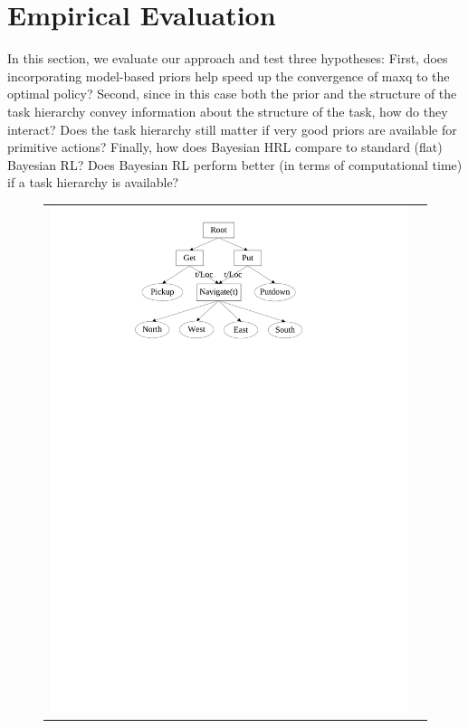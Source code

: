 \section{Empirical Evaluation}
In this section, we evaluate our approach and test three
hypotheses: First, does incorporating model-based priors help speed up
the convergence of {\sc maxq} to the optimal policy? Second, since in
this case both the prior and the structure of the task hierarchy
convey information about the structure of the task, how do they
interact? Does the task hierarchy still matter if very good priors are
available for primitive actions? Finally, how does Bayesian HRL
compare to standard (flat) Bayesian RL? Does Bayesian RL perform
better (in terms of computational time) if a task hierarchy is available?

\begin{figure}[ht]
\begin{tabular}{cc}
\hspace{-1in}\includegraphics[scale=0.6]{Taxi-Hierarchy.pdf} &

\end{tabular}
\end{figure}
